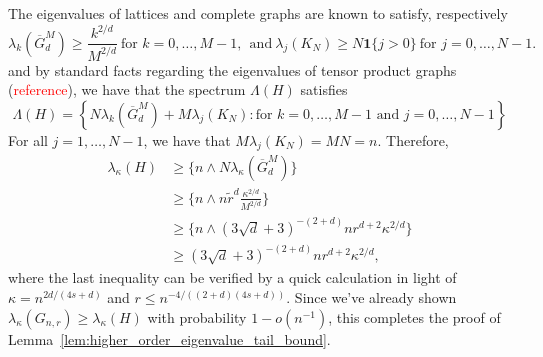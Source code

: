 \documentclass{article}
\newcommand{\set}[1]{\left\{#1\right\}}
\newcommand{\1}{\mathbf{1}}
\newcommand{\wt}[1]{\widetilde{#1}}
\newcommand{\ol}[1]{\overline{#1}}
\theoremstyle{alden}
\theoremstyle{aldenthm}
\theoremstyle{definition}
\theoremstyle{remark}
\begin{document}
The eigenvalues of lattices and complete graphs are known to satisfy, respectively
\begin{equation*}
\lambda_k(\ol{G}^{M}_d) \geq \frac{k^{2/d}}{M^{2/d}}~\textrm{for $k = 0,\ldots,M - 1$},~~ \textrm{and}~\lambda_{j}(K_N) \geq N\1\{j > 0\}~\textrm{for $j = 0,\ldots,N-1$.}
\end{equation*}
and by standard facts regarding the eigenvalues of tensor product graphs (\textcolor{red}{reference}), we have that the spectrum $\Lambda(H)$ satisfies
\begin{equation*}
\Lambda(H) = \set{N\lambda_k(\ol{G}^{M}_d) + M\lambda_j(K_N): \textrm{for $k = 0,\ldots,M - 1$ and $j = 0,\ldots,N-1$}}
\end{equation*}
For all $j = 1,\ldots,N-1$, we have that $M\lambda_j(K_N) = MN = n$. Therefore,
\begin{align*}
\lambda_{\kappa}(H) & \geq \{n \wedge N\lambda_{\kappa}(\ol{G}^{M}_d)\} \\
& \geq \{n \wedge n\wt{r}^d\frac{\kappa^{2/d}}{M^{2/d}}\} \\
& \geq \{n \wedge (3\sqrt{d} + 3)^{-(2+d)}nr^{d+2}\kappa^{2/d}\} \\
& \geq (3\sqrt{d} + 3)^{-(2+d)}nr^{d+2}\kappa^{2/d},
\end{align*}
where the last inequality can be verified by a quick calculation in light of $\kappa = n^{2d/(4s + d)}$ and $r \leq n^{-4/((2+d)(4s + d))}$. Since we've already shown $\lambda_{\kappa}(G_{n,r}) \geq \lambda_{\kappa}(H)$ with probability $1 - o(n^{-1})$, this completes the proof of Lemma~\ref{lem:higher_order_eigenvalue_tail_bound}. 
\end{document}
